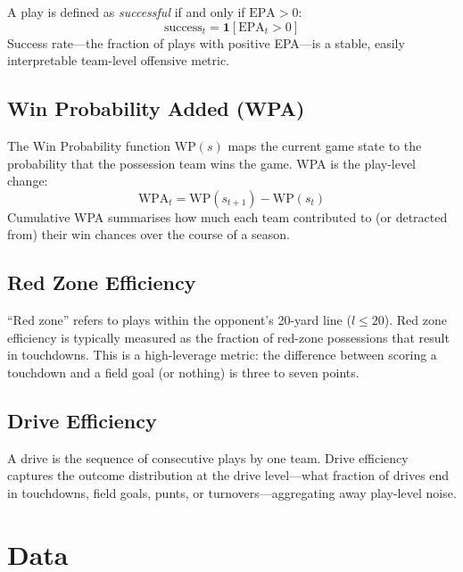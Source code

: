 \documentclass[11pt]{article}
\begin{document}
A play is defined as \emph{successful} if and only if $\text{EPA} > 0$:
\begin{equation}
  \text{success}_t = \mathbf{1}[\text{EPA}_t > 0]
\end{equation}
Success rate---the fraction of plays with positive EPA---is a stable, easily
interpretable team-level offensive metric.

\subsection{Win Probability Added (WPA)}

The Win Probability function $\text{WP}(s)$ maps the current game state to the
probability that the possession team wins the game. WPA is the play-level change:
\begin{equation}
  \text{WPA}_t = \text{WP}(s_{t+1}) - \text{WP}(s_t)
\end{equation}
Cumulative WPA summarises how much each team contributed to (or detracted from)
their win chances over the course of a season.

\subsection{Red Zone Efficiency}

``Red zone'' refers to plays within the opponent's 20-yard line ($l \leq 20$).
Red zone efficiency is typically measured as the fraction of red-zone possessions
that result in touchdowns. This is a high-leverage metric: the difference between
scoring a touchdown and a field goal (or nothing) is three to seven points.

\subsection{Drive Efficiency}

A drive is the sequence of consecutive plays by one team. Drive efficiency captures
the outcome distribution at the drive level---what fraction of drives end in
touchdowns, field goals, punts, or turnovers---aggregating away play-level noise.

\section{Data}
\label{sec:data}
\end{document}
